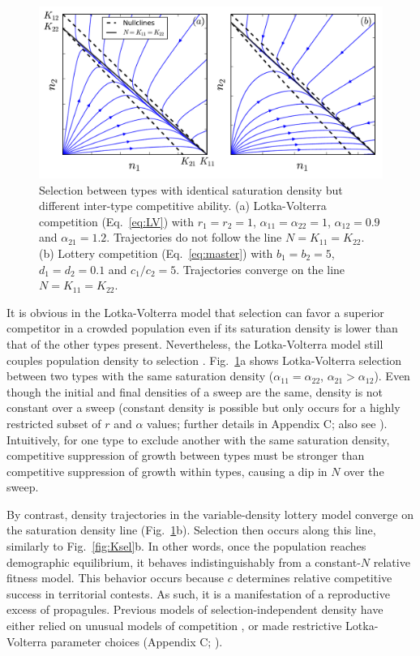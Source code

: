 \documentclass[12pt]{article}
\begin{document}
\begin{figure}
\centering
\includegraphics[scale=0.8]{LVvslottery.pdf}
\caption{\label{fig:LVvslottery} Selection between types with identical saturation density but different inter-type competitive ability. (a) Lotka-Volterra competition (Eq.~\ref{eq:LV}) with $r_1=r_2=1$, $\alpha_{11}=\alpha_{22}=1$, $\alpha_{12}=0.9$ and $\alpha_{21}=1.2$. Trajectories do not follow the line $N=K_{11}=K_{22}$. (b) Lottery competition (Eq.~\ref{eq:master}) with $b_1=b_2=5$, $d_1=d_2=0.1$ and $c_1/c_2=5$. Trajectories converge on the line $N=K_{11}=K_{22}$.}
\end{figure}

It is obvious in the Lotka-Volterra model that selection can favor a superior competitor in a crowded population even if its saturation density is lower than that of the other types present. Nevertheless, the Lotka-Volterra model still couples population density to selection \citep{smouse_1976}. Fig.~\ref{fig:LVvslottery}a shows Lotka-Volterra selection between two types with the same saturation density ($\alpha_{11}=\alpha_{22}$, $\alpha_{21}>\alpha_{12}$). Even though the initial and final densities of a sweep are the same, density is not constant over a sweep (constant density is possible but only occurs for a highly restricted subset of $r$ and $\alpha$ values; further details in Appendix C; also see \citealt{mallet_2012}). Intuitively, for one type to exclude another with the same saturation density, competitive suppression of growth between types must be stronger than competitive suppression of growth within types, causing a dip in $N$ over the sweep. 

By contrast, density trajectories in the variable-density lottery model converge on the saturation density line (Fig.~\ref{fig:LVvslottery}b). Selection then occurs along this line, similarly to Fig.~\ref{fig:Ksel}b. In other words, once the population reaches demographic equilibrium, it behaves indistinguishably from a constant-$N$ relative fitness model. This behavior occurs because $c$ determines relative competitive success in territorial contests. As such, it is a manifestation of a reproductive excess of propagules. Previous models of selection-independent density have either relied on unusual models of competition \citep{kimura1969natural,nei1971fertility}, or made restrictive Lotka-Volterra parameter choices (Appendix C; \citealt{smouse_1976,mallet_2012}).
\end{document}
